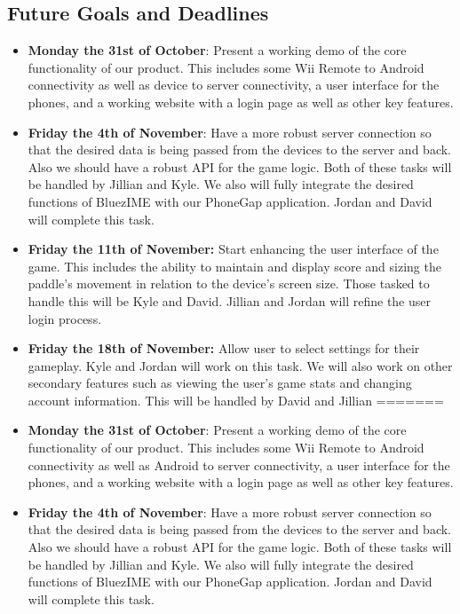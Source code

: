 \documentclass[12pt]{article}
\begin{document}
\subsection{Future Goals and Deadlines}
\begin{itemize}
<<<<<<< HEAD
\item \textbf{Monday the 31st of October}: Present a working demo of the core functionality of our product.  This includes some Wii Remote to Android connectivity as well as device to server connectivity, a user interface for the phones, and a working website with a login page as well as other key features.

\item \textbf{Friday the 4th of November}: Have a more robust server connection so that the desired data is being passed from the devices to the server and back.  Also we should have a robust API for the game logic.  Both of these tasks will be handled by Jillian and Kyle.  We also will fully integrate the desired functions of BluezIME with our PhoneGap application.  Jordan and David will complete this task.

\item \textbf{Friday the 11th of November:} Start enhancing the user interface of the game.  This includes the ability to maintain and display score and sizing the paddle’s movement in relation to the device’s screen size.  Those tasked to handle this will be Kyle and David.  Jillian and Jordan will refine the user login process.

\item \textbf{Friday the 18th of November:} Allow user to select settings for their gameplay.  Kyle and Jordan will work on this task. We will also work on other secondary features such as viewing the user’s game stats and changing account information.  This will be handled by David and Jillian
=======
\item \textbf{Monday the 31st of October}: Present a working demo of the core functionality of our product.  This includes some Wii Remote to Android connectivity as well as Android to server connectivity, a user interface for the phones, and a working website with a login page as well as other key features.

\item \textbf{Friday the 4th of November}: Have a more robust server connection so that the desired data is being passed from the devices to the server and back.  Also we should have a robust API for the game logic.  Both of these tasks will be handled by Jillian and Kyle.  We also will fully integrate the desired functions of BluezIME with our PhoneGap application.  Jordan and David will complete this task.


\end{itemize}
\end{document}
